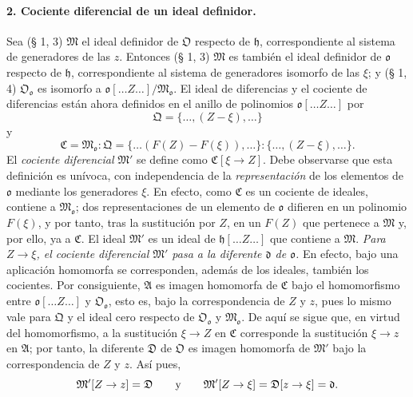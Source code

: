 \paragraph{2. Cociente diferencial de un ideal definidor.}
Sea (§ 1, 3) $\mathfrak M$ el ideal definidor de $\mathfrak O$ respecto de $\mathfrak h$, correspondiente al sistema de generadores de las $z$. Entonces (§ 1, 3) $\mathfrak M$ es también el ideal definidor de $\mathfrak o$ respecto de $\mathfrak h$, correspondiente al sistema de generadores isomorfo de las $\xi$; y (§ 1, 4) $\mathfrak O_{\mathfrak o}$ es isomorfo a $\mathfrak o[\ldots Z\ldots]/\mathfrak M_{\mathfrak o}$. El ideal de diferencias y el cociente de diferencias están ahora definidos en el anillo de polinomios $\mathfrak o[\ldots Z\ldots]$ por
\[
\mathfrak Q=\{\ldots,(Z-\xi),\ldots\}
\]
y
\[
\mathfrak C=\mathfrak M_{\mathfrak o}:\mathfrak Q
=\{\ldots(F(Z)-F(\xi)),\ldots\}:\{\ldots,(Z-\xi),\ldots\}.
\]
El \emph{cociente diferencial} $\mathfrak M'$ se define como $\mathfrak C[\xi\to Z]$. Debe observarse que esta definición es unívoca, con independencia de la \emph{representación} de los elementos de $\mathfrak o$ mediante los generadores $\xi$. En efecto, como $\mathfrak C$ es un cociente de ideales, contiene a $\mathfrak M_{\mathfrak o}$; dos representaciones de un elemento de $\mathfrak o$ difieren en un polinomio $F(\xi)$, y por tanto, tras la sustitución por $Z$, en un $F(Z)$ que pertenece a $\mathfrak M$ y, por ello, ya a $\mathfrak C$. El ideal $\mathfrak M'$ es un ideal de $\mathfrak h[\ldots Z\ldots]$ que contiene a $\mathfrak M$. \emph{Para $Z\to\xi$, el cociente diferencial $\mathfrak M'$ pasa a la diferente $\mathfrak d$ de $\mathfrak o$.} En efecto, bajo una aplicación homomorfa se corresponden, además de los ideales, también los cocientes. Por consiguiente, $\mathfrak A$ es imagen homomorfa de $\mathfrak C$ bajo el homomorfismo entre $\mathfrak o[\ldots Z\ldots]$ y $\mathfrak O_{\mathfrak o}$, esto es, bajo la correspondencia de $Z$ y $z$, pues lo mismo vale para $\mathfrak Q$ y el ideal cero respecto de $\mathfrak O_{\mathfrak o}$ y $\mathfrak M_{\mathfrak o}$. De aquí se sigue que, en virtud del homomorfismo, a la sustitución $\xi\to Z$ en $\mathfrak C$ corresponde la sustitución $\xi\to z$ en $\mathfrak A$; por tanto, la diferente $\mathfrak D$ de $\mathfrak O$ es imagen homomorfa de $\mathfrak M'$ bajo la correspondencia de $Z$ y $z$. Así pues,
\[
\mathfrak M'[Z\to z]=\mathfrak D
\qquad\hbox{y}\qquad
\mathfrak M'[Z\to\xi]=\mathfrak D[z\to\xi]=\mathfrak d.
\]

